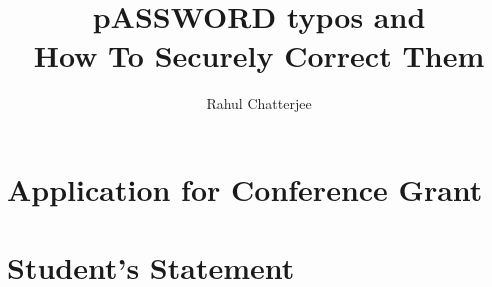 \documentclass[11pt,a4paper,notitlepage]{article}
\title{pASSWORD typos and\\ How To Securely Correct Them}
\author{Rahul Chatterjee}
\begin{document}
\section*{Application for Conference Grant}
\vspace{0.2in}




\section{Student's Statement} 
\end{document}
